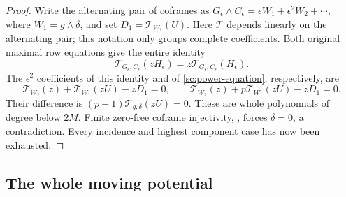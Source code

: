 \documentclass[11pt,a4paper]{amsart}
\numberwithin{equation}{section}
\theoremstyle{plain}
\theoremstyle{definition}
\begin{document}
\begin{proof}
Write the alternating pair of coframes as
\(G_\epsilon\wedge C_\epsilon=\epsilon W_1+\epsilon^2W_2+\cdots\),
where \(W_1=g\wedge\delta\), and set \(D_1=\mathcal T_{W_1}(U)\).
Here \(\mathcal T\) depends linearly on the alternating pair; this
notation only groups complete coefficients.  Both original maximal
row equations give the entire identity
\begin{equation}\label{sc:native-shift-identity}
 \mathcal T_{G_\epsilon,C_\epsilon}(zH_\epsilon)
       =z\mathcal T_{G_\epsilon,C_\epsilon}(H_\epsilon).
\end{equation}
The \(\epsilon^2\) coefficients of this identity and of
\eqref{sc:power-equation}, respectively, are
\[
 \mathcal T_{W_2}(z)+\mathcal T_{W_1}(zU)-zD_1=0,
 \qquad
 \mathcal T_{W_2}(z)+p\mathcal T_{W_1}(zU)-zD_1=0.
\]
Their difference is \((p-1)\mathcal T_{g,\delta}(zU)=0\).
These are whole polynomials of degree below \(2M\).
Finite zero-free coframe injectivity, ,
forces \(\delta=0\), a contradiction.  Every incidence and highest
component case has now been exhausted.
\end{proof}

\subsection{The whole moving potential}
\end{document}
